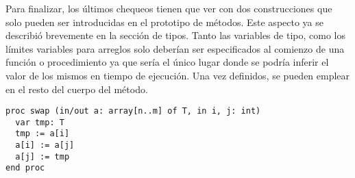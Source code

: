 \documentclass{article}
\begin{document}
Para finalizar, los últimos chequeos tienen que ver con dos construcciones que solo pueden ser introducidas en el prototipo de métodos.
Este aspecto ya se describió brevemente en la sección de tipos.
Tanto las variables de tipo, como los límites variables para arreglos solo deberían ser especificados al comienzo de una función o procedimiento ya que sería el único lugar donde se podría inferir el valor de los mismos en tiempo de ejecución.
Una vez definidos, se pueden emplear en el resto del cuerpo del método.
\begin{lstlisting}
proc swap (in/out a: array[n..m] of T, in i, j: int)
  var tmp: T
  tmp := a[i]
  a[i] := a[j]
  a[j] := tmp
end proc
\end{lstlisting}
\end{document}
